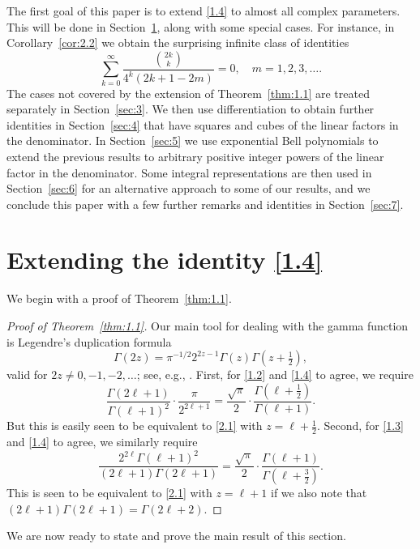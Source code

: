\documentclass{amsart}
\theoremstyle{definition}
\theoremstyle{remark}
\numberwithin{equation}{section}
\begin{document}
The first goal of this paper is to extend \eqref{1.4} to almost all complex
parameters. This will be done in Section~\ref{sec:2}, along with some special
cases. For instance, in Corollary~\ref{cor:2.2} we obtain the surprising
infinite class of identities
\[
\sum_{k=0}^\infty\frac{\binom{2k}{k}}{4^k(2k+1-2m)}=0,\quad m=1, 2, 3,\ldots.
\]
The cases not covered by the extension of Theorem~\ref{thm:1.1} are treated
separately in Section~\ref{sec:3}. We then use differentiation to obtain
further identities in Section~\ref{sec:4} that have squares and cubes of the 
linear factors in the denominator. In Section~\ref{sec:5} we use
exponential Bell polynomials to extend the previous results to arbitrary
positive integer powers of the linear factor in the denominator. Some integral 
representations are then used in Section~\ref{sec:6} for an alternative
approach to some of our results, and we conclude this paper with a few further
remarks and identities in Section~\ref{sec:7}.

\section{Extending the identity \eqref{1.4}}\label{sec:2}

We begin with a proof of Theorem~\ref{thm:1.1}.

\begin{proof}[Proof of Theorem~\ref{thm:1.1}]
Our main tool for dealing with the gamma function is Legendre's duplication
formula
\begin{equation}\label{2.1}
\Gamma(2z) = \pi^{-1/2} 2^{2z-1}\Gamma(z)\Gamma(z+\tfrac{1}{2}),
\end{equation}
valid for $2z\neq 0, -1, -2,\ldots$; see, e.g., \cite[eq.~5.5.5]{DLMF}.
First, for \eqref{1.2} and \eqref{1.4} to agree, we require
\[
\frac{\Gamma(2\ell+1)}{\Gamma(\ell+1)^2}\cdot\frac{\pi}{2^{2\ell+1}}
=\frac{\sqrt{\pi}}{2}\cdot\frac{\Gamma(\ell+\tfrac{1}{2})}{\Gamma(\ell+1)}.
\]
But this is easily seen to be equivalent to \eqref{2.1} with
$z=\ell+\tfrac{1}{2}$. Second, for \eqref{1.3} and \eqref{1.4} to agree, we
similarly require
\[
\frac{2^{2\ell}\Gamma(\ell+1)^2}{(2\ell+1)\Gamma(2\ell+1)}
=\frac{\sqrt{\pi}}{2}\cdot\frac{\Gamma(\ell+1)}{\Gamma(\ell+\tfrac{3}{2})}.
\]
This is seen to be equivalent to \eqref{2.1} with $z=\ell+1$ if we also note
that $(2\ell+1)\Gamma(2\ell+1)=\Gamma(2\ell+2)$.
\end{proof}

We are now ready to state and prove the main result of this section.
\end{document}
